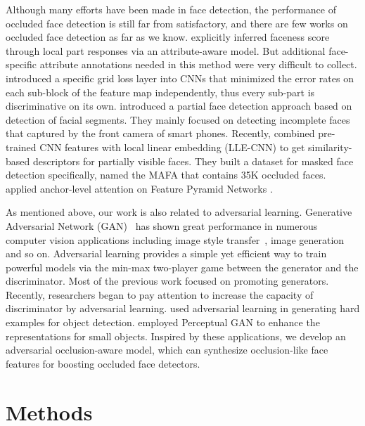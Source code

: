\documentclass[10pt,twocolumn,letterpaper]{article}
\begin{document}
Although many efforts have been made in face detection, the performance of occluded face detection is still far from satisfactory, and there are few works on occluded face detection as far as we know. \cite{yang2015facial} explicitly inferred faceness score through local part responses via an attribute-aware model. But additional face-specific attribute annotations needed in this method were very difficult to collect. 
\cite{opitz2016grid} introduced a specific grid loss layer into CNNs that minimized the error rates on each sub-block of the feature map independently, thus every sub-part is discriminative on its own. 
\cite{mahbub2016partial} introduced a partial face detection approach based on detection of facial segments. They mainly focused on detecting incomplete faces that captured by the front camera of smart phones. Recently, \cite{ge2017detecting} combined pre-trained CNN features with local linear embedding (LLE-CNN) to get similarity-based descriptors for partially visible faces. They built a dataset for masked face detection specifically, named the MAFA that contains 35K occluded faces. \cite{wang2017fan} applied anchor-level attention on Feature Pyramid Networks \cite{DBLP:journals/corr/LinDGHHB16}.

As mentioned above, our work is also related to adversarial learning. Generative Adversarial Network (GAN)~\cite{goodfellow2014generative} has shown great performance in numerous computer vision applications including image style transfer~\cite{zhu2017unpaired,pix2pix2016}, image generation~\cite{shrivastava2016learning,huang2017beyond} and so on. Adversarial learning provides a simple yet efficient way to train powerful models via the min-max two-player game between the generator and the discriminator. Most of the previous work focused on promoting generators. Recently, researchers began to pay attention to increase the capacity of discriminator by adversarial learning. \cite{wang2017fast} used adversarial learning in generating hard examples for object detection. \cite{li2017perceptual} employed Perceptual GAN to enhance the representations for small objects. Inspired by these applications, we develop an adversarial occlusion-aware model, which can synthesize occlusion-like face features for boosting occluded face detectors.


\section{Methods}
\end{document}
